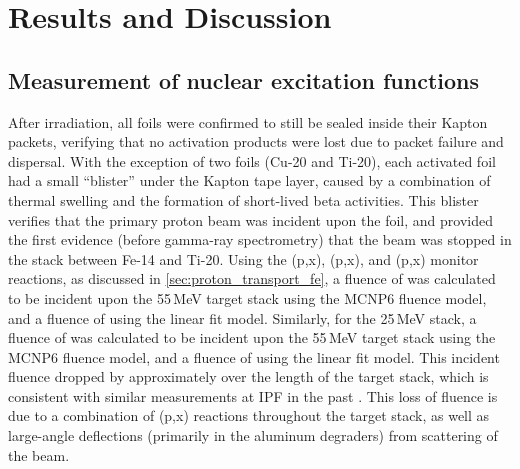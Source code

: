 \section{\label{sec:results_fe}Results and Discussion}


\subsection{Measurement of nuclear excitation functions}

After irradiation, all foils were confirmed to still be sealed inside their Kapton packets, verifying that no activation products were lost due to packet failure and dispersal.
With the exception of two foils (Cu-20 and Ti-20), each activated foil had a small \enquote{blister} under the Kapton tape layer, caused by a combination of thermal swelling and the formation of short-lived beta activities.
This blister   verifies that the primary proton beam was incident upon the foil, and provided the first evidence (before gamma-ray spectrometry) that the beam was stopped in the stack between Fe-14 and Ti-20.
Using the (p,x), (p,x), and (p,x) monitor reactions, as discussed in \autoref{sec:proton_transport_fe}, a fluence of  was calculated to be incident upon the 55\,MeV target stack using the MCNP6 fluence model, and a  fluence of  using the linear fit model.
Similarly, for the 25\,MeV stack, a fluence of  was calculated to be incident upon the 55\,MeV target stack using the MCNP6 fluence model, and a  fluence of  using the linear fit model.
This incident fluence dropped by approximately  over the length of the target stack, which is consistent with similar measurements at IPF in the past \cite{Voyles2018a,Graves2016}.
This loss of fluence is due to a combination of 
(p,x) reactions throughout the target stack, as well as large-angle deflections (primarily in the aluminum degraders) from scattering of the beam.




